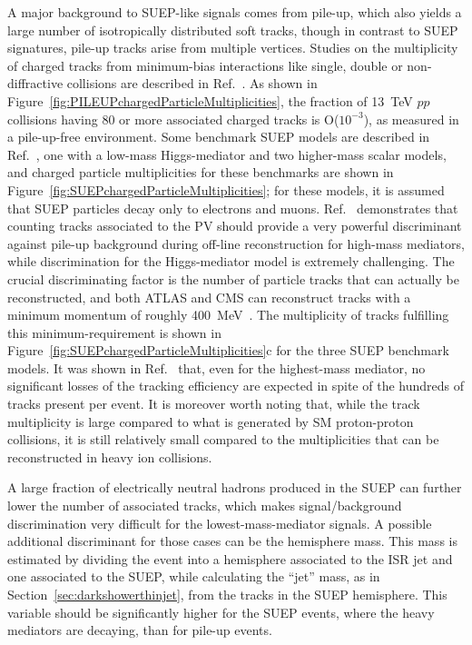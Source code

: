 A major background to SUEP-like signals comes from pile-up, which also yields a large number of isotropically distributed soft tracks, though in contrast to SUEP signatures, pile-up tracks arise from multiple vertices. Studies on the multiplicity of charged tracks from minimum-bias interactions like single, double or non-diffractive collisions are described in Ref.~\cite{Aad:2016mok}. As shown in Figure~\ref{fig:PILEUPchargedParticleMultiplicities}, the fraction of 13~TeV $pp$ collisions having 80 or more associated charged tracks is O($10^{-3}$), as measured in a pile-up-free environment. Some benchmark SUEP models are described in Ref.~\cite{Knapen:2016hky}, one with a low-mass Higgs-mediator and two higher-mass scalar models, and charged particle multiplicities for these benchmarks are shown in Figure~\ref{fig:SUEPchargedParticleMultiplicities}; for these models, it is assumed that SUEP particles decay only  to electrons and muons. Ref.~\cite{Knapen:2016hky} demonstrates that counting tracks associated to the PV should provide a very powerful discriminant against pile-up background during off-line reconstruction for high-mass mediators, while discrimination for the Higgs-mediator model is extremely challenging. The crucial discriminating factor is the number of particle tracks that can actually be reconstructed, and both ATLAS and CMS can reconstruct tracks with a minimum momentum of roughly 400~MeV~\cite{Sirunyan:2017ulk}. The multiplicity of tracks fulfilling this minimum-\pt requirement is shown in Figure~\ref{fig:SUEPchargedParticleMultiplicities}c for the three SUEP benchmark models. It was shown in Ref.~\cite{Knapen:2016hky} that, even for the highest-mass mediator, no significant losses of the tracking efficiency are expected  in spite of the hundreds of tracks present per event. It is moreover worth noting that, while the track multiplicity is large compared to what is generated by SM proton-proton collisions, it is still relatively small compared to the multiplicities that can be reconstructed in heavy ion collisions. 

A large fraction of electrically neutral hadrons produced in the SUEP can further lower the number of associated tracks, which makes signal/background discrimination very difficult for the lowest-mass-mediator signals. A possible additional discriminant for those cases can be the hemisphere mass. This mass is estimated by dividing the event into a hemisphere associated to the ISR jet and one associated to the SUEP, while calculating the ``jet'' mass, as in Section~\ref{sec:darkshowerthinjet}, from the tracks in the SUEP hemisphere. This variable should be significantly higher for the SUEP events, where the heavy mediators are decaying, than for pile-up events.

